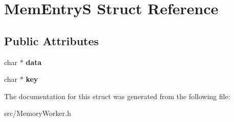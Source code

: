 \hypertarget{struct_mem_entry_s}{}\section{Mem\+EntryS Struct Reference}
\label{struct_mem_entry_s}
\subsection*{Public Attributes}
\begin{DoxyCompactItemize}
\item 
\mbox{\label{struct_mem_entry_s_a618f6de313c16300e89fff54788377a6}} 
char $\ast$ {\bfseries data}
\item 
\mbox{\label{struct_mem_entry_s_a6f669001ee897172eef563b615a789f0}} 
char $\ast$ {\bfseries key}
\end{DoxyCompactItemize}


The documentation for this struct was generated from the following file\+:\begin{DoxyCompactItemize}
\item 
src/Memory\+Worker.\+h\end{DoxyCompactItemize}

